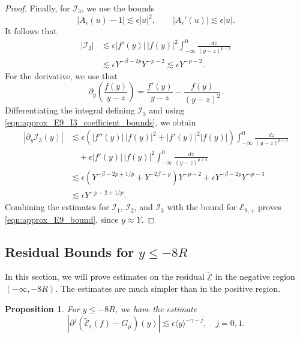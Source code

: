 \documentclass[11pt]{amsart}
\newtheorem{proposition}[theorem]{Proposition}
\theoremstyle{definition}
\theoremstyle{remark}
\numberwithin{equation}{section}
\newcommand{\sq}[1]{\widetilde{#1}}
\newcommand{\mc}[1]{\mathcal{#1}}
\newcommand{\ang}[1]{\langle #1 \rangle}
\begin{document}
\begin{proof}
    Finally, for $\mc{I}_3$, we use the bounds
    \begin{equation}\label{eqn:approx_E9_I3_coefficient_bounds}
        |A_\epsilon(u)-1|\lesssim\epsilon|u|^2,\qquad
        |A_\epsilon'(u)|\lesssim\epsilon|u|.
    \end{equation}
    It follows that
    \begin{align*}
        |\mc{I}_3|
        &\lesssim\epsilon|f'(y)|\,|f(y)|^2\int_{-\infty}^0\frac{dz}{(y-z)^{p+3}}\\
        &\lesssim\epsilon Y^{-\beta-2p}Y^{-p-2}
        \lesssim\epsilon Y^{-p-2}.
    \end{align*}
    For the derivative, we use that
    \[\partial_y\left(\frac{f(y)}{y-z}\right)=\frac{f'(y)}{y-z}-\frac{f(y)}{(y-z)^2}.\]
    Differentiating the integral defining $\mc{I}_3$ and using \eqref{eqn:approx_E9_I3_coefficient_bounds}, we obtain
    \begin{align*}
        |\partial_y\mc{I}_3(y)|
        &\lesssim\epsilon\left(|f''(y)|\,|f(y)|^2+|f'(y)|^2|f(y)|\right)\int_{-\infty}^0\frac{dz}{(y-z)^{p+3}}\\
        &\quad+\epsilon|f'(y)|\,|f(y)|^2\int_{-\infty}^0\frac{dz}{(y-z)^{p+4}}\\
        &\lesssim\epsilon\left(Y^{-\beta-2p+1/p}+Y^{-2\beta-p}\right)Y^{-p-2}
        +\epsilon Y^{-\beta-2p}Y^{-p-3}\\
        &\lesssim\epsilon Y^{-p-2+1/p}.
    \end{align*}
    Combining the estimates for $\mc{I}_1$, $\mc{I}_2$, and $\mc{I}_3$ with the bound for $\mc{E}_{9,+}$ proves \eqref{eqn:approx_E9_bound}, since $y\approx Y$.
\end{proof}

\subsection{Residual Bounds for \texorpdfstring{$y \leq -8R$}{y <= -8R}} 

In this section, we will prove estimates on the residual $\sq{\mc{E}}$ in the negative region $(-\infty, -8R)$. The estimates are much simpler than in the positive region.

\begin{proposition}\label{prop:approx_residual_negative}
    For $y \leq -8R$, we have the estimate
    \[|\partial^j(\sq{\mc{E}}_\epsilon(f)-G_\mu)(y)| \lesssim \epsilon \ang{y}^{-\gamma - j}, \quad j = 0,1.\]
\end{proposition}
\end{document}
